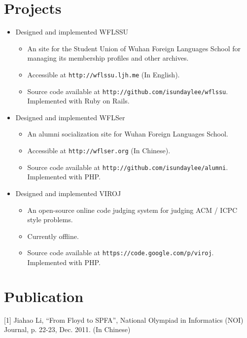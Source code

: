 \documentclass[margin]{res}
\begin{document}
\begin{resume}
\section{Projects}

\begin{itemize}
    \item{
        Designed and implemented WFLSSU
        \begin{itemize}
            \item{An site for the Student Union of Wuhan Foreign Languages School for managing its membership profiles and other archives. }
            \item{Accessible at {\tt http://wflssu.ljh.me} (In English). }
            \item{Source code available at {\tt http://github.com/isundaylee/wflssu}. Implemented with Ruby on Rails. }
        \end{itemize}
    }
    \item{
        Designed and implemented WFLSer
        \begin{itemize}
            \item{An alumni socialization site for Wuhan Foreign Languages School. }
            \item{Accessible at {\tt http://wflser.org} (In Chinese). }
            \item{Source code available at {\tt http://github.com/isundaylee/alumni}. Implemented with PHP. }
        \end{itemize}
        }
    \item{
        Designed and implemented VIROJ
        \begin{itemize}
            \item{An open-source online code judging system for judging ACM / ICPC style problems. }
            \item{Currently offline. }
            \item{Source code available at {\tt https://code.google.com/p/viroj}. Implemented with PHP. }
        \end{itemize}
    }
\end{itemize}

\section{Publication}

[1] Jiahao Li, ``From Floyd to SPFA'', National Olympiad in Informatics (NOI) Journal, p. 22-23, Dec. 2011. (In Chinese)


\end{resume}
\end{document}
